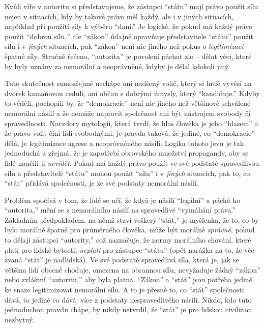 \documentclass{book}
\begin{document}
Kvůli víře v autoritu si představujeme, že zástupci \enquote{státu} mají právo použít sílu nejen v situacích, kdy by takové právo měl každý, ale i v jiných situacích, například při použití síly k výběru \enquote{daní.} Je logické, že pokud má každý právo použít \enquote{dobrou sílu,} ale \enquote{zákon} údajně opravňuje představitele \enquote{státu} použít sílu i v \emph{jiných} situacích, pak \enquote{zákon} není nic jiného než pokus o \emph{legitimizaci} špatné síly. Stručně řečeno, \enquote{autorita} je povolení páchat zlo -- dělat věci, které by byly uznány za nemorální a neoprávněné, kdyby je dělal kdokoli jiný.

Tuto skutečnost samozřejmě nechápe ani nadšený volič, který si hrdě vyvěsí na dvorek kamaňovou ceduli, ani občan s dobrými úmysly, který \enquote{kandiduje.} Kdyby to věděli, pochopili by, že \enquote{demokracie} není nic jiného než většinově schválené nemorální násilí a že nemůže napravit společnost ani být nástrojem svobody či spravedlnosti. Navzdory mytologii, která tvrdí, že hlas člověka je jeho \enquote{hlasem} a že právo volit činí lidi svobodnými, je pravda taková, že jediné, co \enquote{demokracie} dělá, je legitimizace agrese a neoprávněného násilí. Logika tohoto jevu je tak jednoduchá a zřejmá, že je zapotřebí obrovského množství propagandy, aby se lidé naučili ji \emph{nevidět}. Pokud má každý právo použít ve své podstatě spravedlivou sílu a představitelé \enquote{státu} mohou použít \enquote{sílu} i v \emph{jiných} situacích, pak to, co \enquote{stát} přidává společnosti, je ze své podstaty nemorální násilí.

Problém spočívá v tom, že lidé se učí, že když je násilí \enquote{legální} a páchá ho \enquote{autorita,} mění se z nemorálního násilí na spravedlivé \enquote{vymáhání práva.} Základním předpokladem, na němž staví veškerý \enquote{stát,} je myšlenka, že to, co by bylo morálně špatné pro průměrného člověka, může být morálně \emph{správné}, pokud to dělají zástupci \enquote{autority,} což naznačuje, že normy morálního chování, které platí pro lidské bytosti, \emph{neplatí} pro zástupce \enquote{státu} (opět narážka na to, že věc zvaná \enquote{stát} je nadlidská). Ve své podstatě spravedlivá síla, která je, jak se většina lidí obecně shoduje, omezena na obrannou sílu, nevyžaduje žádný \enquote{zákon} nebo zvláštní \enquote{autoritu,} aby byla platná. \enquote{Zákon} a \enquote{stát} jsou potřeba jedině ke snaze legitimizovat nemorální sílu. A to je přesně to, co \enquote{stát} společnosti dává, to jediné co dává: více z podstaty nespravedlivého násilí. Nikdo, kdo tuto jednoduchou pravdu chápe, by nikdy netvrdil, že \enquote{stát} je pro lidskou civilizaci nezbytný.
\end{document}
